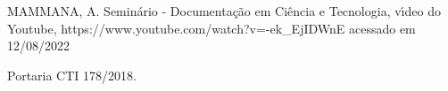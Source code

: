 \documentclass[
12pt,		%
openright,	%
twoside,  %
a4paper,			%
chapter=TITLE,		%
english,			%
french,				%
spanish,			%
brazil				%
]{USPSC-classe/USPSC}
\begin{document}
\begin{flushleft}
\begin{flushleft}
\begin{flushleft}
\begin{flushleft}
\begin{flushleft}
\begin{flushleft}
\begin{flushleft}
\begin{flushleft}
\begin{flushleft}
\begin{flushleft}
[MAMMANA, 2020] MAMMANA, A. Semin\'ario - Documenta\c{c}\~ao em Ci\^encia e Tecnologia, v\'{\i}deo do Youtube, https://www.youtube.com/watch?v=-ek\_EjIDWnE acessado em 12/08/2022
\end{flushleft}


\end{flushleft}


\end{flushleft}


\end{flushleft}


\end{flushleft}


\end{flushleft}


\end{flushleft}


\end{flushleft}


\end{flushleft}


\end{flushleft}


\begin{flushleft}
\begin{flushleft}
\begin{flushleft}
\begin{flushleft}
\begin{flushleft}
\begin{flushleft}
\begin{flushleft}
\begin{flushleft}
\begin{flushleft}
\begin{flushleft}
[CTI, 2018] Portaria CTI 178/2018.
\end{flushleft}


\end{flushleft}


\end{flushleft}


\end{flushleft}


\end{flushleft}


\end{flushleft}


\end{flushleft}


\end{flushleft}


\end{flushleft}


\end{flushleft}
\end{document}
